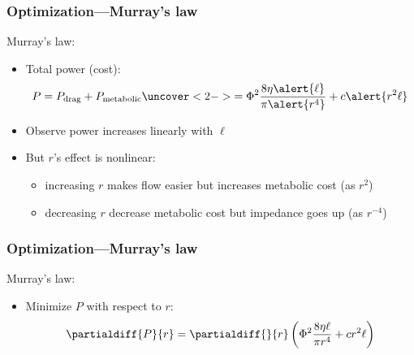 \begin{frame}
  \frametitle{Optimization---Murray's law}

  \begin{block}{Murray's law:}
    \begin{itemize}
    \item<1-> Total power (cost):
      $$ 
      P = P_{\textnormal{drag}} + P_{\textnormal{metabolic}}
      \uncover<2->{=
      \Phi^2 \frac{8\eta \alert{\ell}}{\pi \alert{r^4}}
      + c \alert{r^2 \ell}}
      $$
    \item<3-> Observe power increases linearly with $\ell$
    \item<4-> But $r$'s effect is nonlinear: 
      \begin{itemize}
      \item<5->  
        increasing $r$
        makes flow easier \alert{but increases metabolic cost} (as $r^2$)
      \item<6->
        decreasing $r$
        decrease metabolic cost \alert{but impedance goes up} (as $r^{-4}$)
      \end{itemize}
    \end{itemize}
  \end{block}

\end{frame}


\begin{frame}
  \frametitle{Optimization---Murray's law}

  \begin{block}{Murray's law:}
    \begin{itemize}
    \item<1-> Minimize $P$ with respect to $r$:
      $$
      \partialdiff{P}{r}
      = 
      \partialdiff{}{r} 
      \left( 
        \Phi^2 \frac{8\eta {\ell}}{\pi {r^4}}
      + c {r^2 \ell}
      \right)
    $$
    \end{itemize}
  \end{block}

\end{frame}


